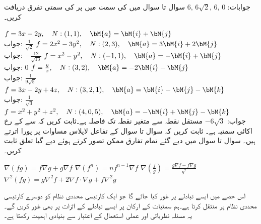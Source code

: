 جوابات:
$6,\,6\sqrt{2},\, 6,\, 0$
سوال  تا سوال  میں  کی سمت میں  پر  کی سمتی تفرق دریافت کریں۔

\quad
$f=3x-2y,\quad N:(1,1),\quad \bM{a}=\bM{i}+\bM{j}$\\
جواب:\quad
$\tfrac{1}{\sqrt{2}}$
\quad
$f=2x^2-3y^2,\quad N:(2,3),\quad \bM{a}=3\bM{i}+2\bM{j}$\\
جواب:\quad
$-\tfrac{12}{\sqrt{13}}$
\quad
$f=x^2-y^2,\quad N:(-1,1),\quad \bM{a}=-\bM{i}+\bM{j}$\\
جواب:\quad
$0$
\quad
$f=\frac{y}{x},\quad N:(3,2),\quad \bM{a}=-2\bM{i}-\bM{j}$\\
جواب:\quad
$\tfrac{1}{9\sqrt{5}}$
\quad
$f=3x-2y+4z,\quad N:(3,2,1),\quad \bM{a}=\bM{i}-\bM{j}-\bM{k}$\\
جواب:\quad
$\tfrac{1}{\sqrt{3}}$
\quad
$f=x^2+y^2+z^2,\quad N:(4,0,5),\quad \bM{a}=-\bM{i}+\bM{j}-\bM{k}$\\
جواب:\quad
$-6\sqrt{3}$
مستقل نقطہ  سے متغیر نقطہ  تک فاصلہ  ہے۔ثابت کریں کہ  سے   کے رخ اکائی سمتیہ   ہے۔  
ثابت کریں کہ سوال  تا سوال  کے تفاعل لاپلاس مساوات پر پورا اترتے ہیں۔
سوال  تا سوال  میں دیے گئے تمام تفارق ممکن تصور کرتے ہوئے دیے گیا تعلق ثابت کریں۔

\quad
$\nabla(fg)=f\nabla g+g\nabla f$
\quad
$\nabla(f^n)=nf^{n-1}\nabla f$
\quad
$\nabla(\frac{f}{g})=\frac{g\nabla f-f\nabla g}{g^2}$
\quad
$\nabla^2(fg)=g\nabla^2f+2\nabla f\cdot \nabla g+f\nabla^2 g$

اس حصے میں ایسے تبادلے پر غور کیا جائے گا جو ایک کارتیسی محددی نظام کو دوسرے کارتیسی محددی نظام پر منتقل کرتا ہے۔ہم سمتیات کے ارکان پر ایسے تبادلے کے اثرات پر بھی غور کریں گے۔یہ مسئلہ نظریاتی اور عملی استعمال کے اعتبار  سے بنیادی اہمیت رکھتا ہے۔

